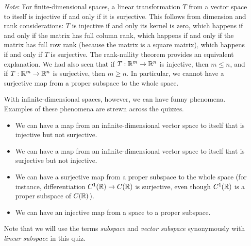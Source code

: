 \documentclass[10pt]{amsart}
\begin{document}
{\em Note}: For finite-dimensional spaces, a linear transformation $T$
from a vector space to itself is injective if and only if it is
surjective. This follows from dimension and rank considerations: $T$
is injective if and only its kernel is zero, which happens if and only
if the matrix has full column rank, which happens if and only if the
matrix has full row rank (because the matrix is a square matrix),
which happens if and only if $T$ is surjective. The rank-nullity
theorem provides an equivalent explanation. We had also seen that if
$T:\mathbb{R}^m \to \mathbb{R}^n$ is injective, then $m \le n$, and if $T: \mathbb{R}^m \to
\mathbb{R}^n$ is surjective, then $m \ge n$. In particular, we cannot have a
surjective map from a proper subspace to the whole space.

With infinite-dimensional spaces, however, we can have funny
phenomena. Examples of these phenomena are strewn across the quizzes.

\begin{itemize}
\item We can have a map from an infinite-dimensional vector space to
  itself that is injective but not surjective.
\item We can have a map from an infinite-dimensional vector space to
  itself that is surjective but not injective.
\item We can have a surjective map from a proper subspace to the whole
  space (for instance, differentiation $C^1(\mathbb{R}) \to C(\mathbb{R})$ is
  surjective, even though $C^1(\mathbb{R})$ is a proper subspace of $C(\mathbb{R})$).
\item We can have an injective map from a space to a proper subspace.
\end{itemize}

Note that we will use the terms {\em subspace} and {\em vector
  subspace} synonymously with {\em linear subspace} in this quiz.
\end{document}

